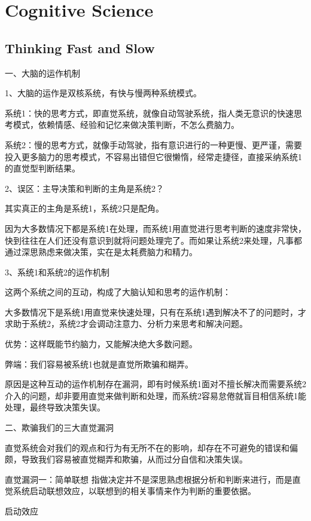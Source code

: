 \documentclass[12pt,]{krantz}
\begin{document}
\chapter{Cognitive Science}\label{cognitive-science}

\section{Thinking Fast and Slow}\label{thinking-fast-and-slow}

一、大脑的运作机制

1、大脑的运作是双核系统，有快与慢两种系统模式。

系统1：快的思考方式，即直觉系统，就像自动驾驶系统，指人类无意识的快速思考模式，依赖情感、经验和记忆来做决策判断，不怎么费脑力。

系统2：慢的思考方式，就像手动驾驶，指有意识进行的一种更慢、更严谨，需要投入更多脑力的思考模式，不容易出错但它很懒惰，经常走捷径，直接采纳系统1的直觉型判断结果。

2、误区：主导决策和判断的主角是系统2？

其实真正的主角是系统1，系统2只是配角。

因为大多数情况下都是系统1在处理，而系统1用直觉进行思考判断的速度非常快，快到往往在人们还没有意识到就将问题处理完了。而如果让系统2来处理，凡事都通过深思熟虑来做决策，实在是太耗费脑力和精力。

3、系统1和系统2的运作机制

这两个系统之间的互动，构成了大脑认知和思考的运作机制：

大多数情况下是系统1用直觉来快速处理，只有在系统1遇到解决不了的问题时，才求助于系统2，系统2才会调动注意力、分析力来思考和解决问题。

优势：这样既能节约脑力，又能解决绝大多数问题。

弊端：我们容易被系统1也就是直觉所欺骗和糊弄。

原因是这种互动的运作机制存在漏洞，即有时候系统1面对不擅长解决而需要系统2介入的问题，却非要用直觉来做判断和处理，而系统2容易怠倦就盲目相信系统1能处理，最终导致决策失误。

二、欺骗我们的三大直觉漏洞

直觉系统会对我们的观点和行为有无所不在的影响，却存在不可避免的错误和偏颇，导致我们容易被直觉糊弄和欺骗，从而过分自信和决策失误。

直觉漏洞一：简单联想
指做决定并不是深思熟虑根据分析和判断来进行，而是直觉系统启动联想效应，以联想到的相关事情来作为判断的重要依据。

启动效应
\end{document}
